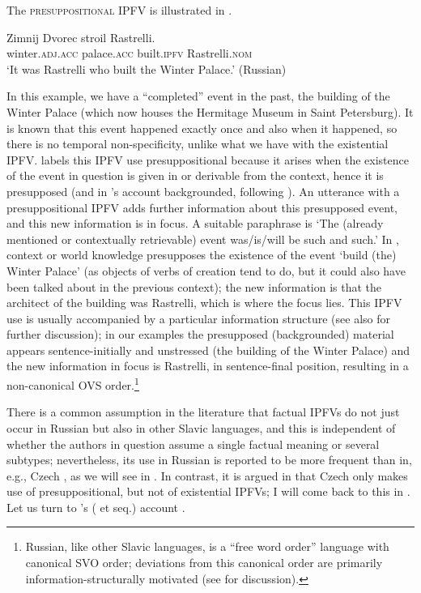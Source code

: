 \documentclass[output=paper,colorlinks,citecolor=brown]{langscibook}
\begin{document}
The \textsc{presuppositional IPFV} is illustrated in  \citep[from][108; my glosses and translation]{glovinskaja81}.

\ea\label{ex:presuppositional}
\gll Zimnij Dvorec stroil Rastrelli.\\
winter.\textsc{adj.acc} palace.\textsc{acc} built.\textsc{ipfv} Rastrelli.\textsc{nom}\\
\glt `It was Rastrelli who built the Winter Palace.' \hfill (Russian)
\z

\noindent In this example, we have a ``completed'' event in the past, the building of the Winter Palace (which now houses the Hermitage Museum in Saint Petersburg). It is known that this event happened exactly once and also when it happened, so there is no temporal non-specificity, unlike what we have with the existential IPFV. \citet{gronndiss} labels this IPFV use presuppositional because it arises when the existence of the event in question is given in or derivable from the context, hence it is presupposed (and in \citeauthor{gronndiss}'s account backgrounded, following \cite{geurtssandt97}). An utterance with a presuppositional IPFV adds further information about this presupposed event, and this new information is in focus. A suitable paraphrase is `The (already mentioned or contextually retrievable) event was/is/will be such and such.' In , context or world knowledge presupposes the existence of the event `build (the) Winter Palace' (as objects of verbs of creation tend to do, but it could also have been talked about in the previous context); the new information is that the architect of the building was Rastrelli, which is where the focus lies. This IPFV use is usually accompanied by a particular information structure (see also \citealt{Borik.Gehrke2018} for further discussion); in our examples the presupposed (backgrounded) material appears sentence-initially and unstressed (the building of the Winter Palace) and the new information in focus is Rastrelli, in sentence-final position, resulting in a non-canonical OVS order.\footnote{Russian, like other Slavic languages, is a ``free word order'' language with canonical SVO order; deviations from this canonical order are primarily information-structurally motivated (see \citealt{jasinsimik} for discussion).} 

There is a common assumption in the literature that factual IPFVs do not just occur in Russian but also in other Slavic languages, and this is independent of whether the authors in question assume a single factual meaning or several subtypes; nevertheless, its use in Russian is reported to be more frequent than in, e.g., Czech \citep[e.g.][]{Dickey2000,alvestad13%
,duebbersdiss,Mueller-Reichau2018a,klimek22}%
, as we will see in . In contrast, it is argued in \citet{gehrke22} that Czech only makes use of presuppositional, but not of existential IPFVs; I will come back to this in . Let us turn to \citeauthor{gronndiss}'s (\citeyear{gronndiss} et seq.) account%
. 
\end{document}
